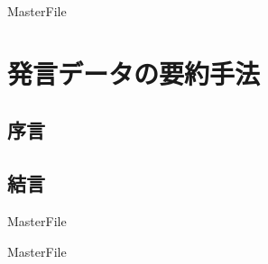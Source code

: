 \expandafter\ifx\csname MasterFile\endcsname\relax
	\def\SubFile{hoge}
  
  
	\setcounter{chapter}{2}
  \fi
  \cleardoublepage
\chapter{発言データの要約手法}
%
\label{model:chapter}

\section{序言}
\label{model:introduction}
\section{結言}
\label{model:conclusion}
 \expandafter\ifx\csname MasterFile\endcsname\relax
	\def\BibFile{hoge}
	
  \fi
  \expandafter\ifx\csname MasterFile\endcsname\relax
  
  \fi
